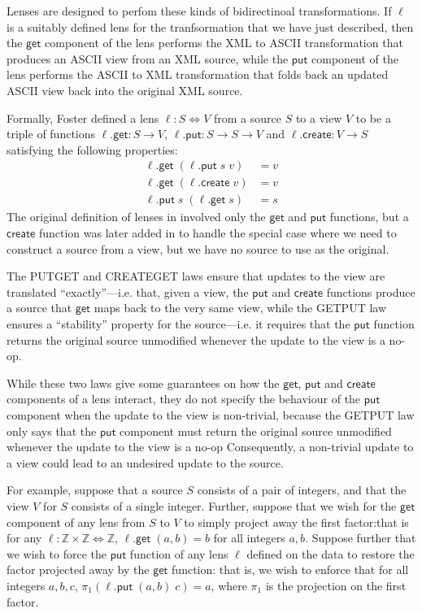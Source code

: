 \documentclass[acmsmall,review,anonymous]{acmart}\settopmatter{printfolios=true,printccs=false,printacmref=false}
\newcommand{\kw}[1]{\ensuremath{\mathsf{#1}}\xspace}
\newcommand{\get}{\ensuremath{\kw{get}}\xspace}
\newcommand{\pput}{\ensuremath{\kw{put}}\xspace}
\newcommand{\create}{\ensuremath{\kw{create}}\xspace}
\begin{document}
Lenses are designed to perfom these kinds of bidirectinoal transformations. If
$\ell$ is a suitably defined lens for the tranfsormation that we
have just described, then the \get component of the lens performs the
XML to ASCII transformation that produces an ASCII view from an XML source,
while the \pput component of the lens performs the ASCII to XML transformation
that folds back an updated ASCII view back into the original XML source.

Formally, Foster \cite{foster2007combinators,foster2009bidirectional} defined a lens $\ell :
S \Leftrightarrow V$ from a source $S$ to a view $V$ to be a triple of
functions $\ell.\get : S \longrightarrow V$, $\ell.\pput : S \longrightarrow S
\longrightarrow V$ and $\ell.\create : V \longrightarrow S$ satisfying the
following properties:
\begin{align*}
\ell.\get \; (\ell.\pput \; s \; v) &= v \tag{PUTGET}\\
\ell.\get \; (\ell.\create \; v) &= v \tag{CREATEGET}\\
\ell.\pput \; s \; (\ell.\get \; s) &= s \tag{GETPUT}
\end{align*}
The original definition of lenses in \cite{foster2007combinators} involved only
the \get and \pput functions, but a \create function was later added in
\cite{foster2009bidirectional} to handle the special case where we need to
construct a source from a view, but we have no source to use as the original. 

The PUTGET and CREATEGET laws ensure that updates to the view are translated
``exactly''---i.e. that, given a view, the \pput and \create functions produce
a source that \get maps back to the very same view, while the GETPUT law ensures
a ``stability'' property for the source---i.e. it requires that the \pput
function returns the original source unmodified whenever the update to the view
is a no-op.

While these two laws give some guarantees on how the \get, \pput and \create
components of a lens interact, they do not specify the behaviour of the \pput
component when the update to the view is non-trivial, because the GETPUT law
only says that the \pput component must return the original source unmodified
whenever the update to the view is a no-op Consequently, a non-trivial update
to a view could lead to an undesired update to the source.

For example, suppose that a source $S$ consists of a pair of integers, and
that the view $V$ for $S$ consists of a single integer. Further, suppose that we
wish for the \get component of any lens from $S$ to $V$ to simply project away
the first factor:that is for any $\ell : \mathbb{Z} \times \mathbb{Z}
\Leftrightarrow \mathbb{Z}$, $\ell.\get \; (a, b) = b$ for all integers $a, b$.
Suppose further that we wish to force the \pput function of any lens $\ell$
defined on the data to restore the factor projected away by the \get function:
that is, we wish to enforce that for all integers $a, b, c$, $\pi_1(\ell.\pput
\; (a, b) \; c) = a$, where $\pi_1$ is the projection on the first factor.
\end{document}
